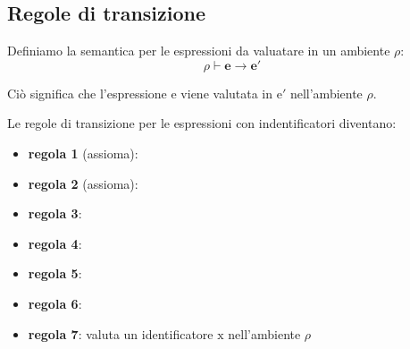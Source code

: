 \subsection{Regole di transizione}
Definiamo la semantica per le espressioni da valuatare in un ambiente $\rho$:
\[
    \rho \vdash \mathbf{e} \to \mathbf{e'}
\]

Ciò significa che l'espressione $\mathrm{e}$ viene valutata in $\mathrm{e}'$ nell'ambiente $\rho$.

\smallskip
Le regole di transizione per le espressioni con indentificatori diventano:
\begin{itemize}[label=$\triangleright$, itemsep=\smallskipamount]
    \item \textbf{regola 1} (assioma):
    \item \textbf{regola 2} (assioma):
    \item \textbf{regola 3}:
    \item \textbf{regola 4}:
    \item \textbf{regola 5}:
    \item \textbf{regola 6}:
    \item \textbf{regola 7}: valuta un identificatore $\mathrm{x}$ nell'ambiente $\rho$
\end{itemize}

